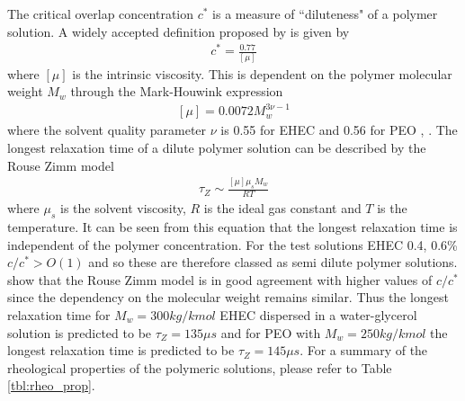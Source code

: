 \documentclass[11pt]{article}
\begin{document}
The critical overlap concentration $c^*$ is a measure of ``diluteness" of a polymer solution. A widely accepted definition proposed by \cite{graessley1980polymer} is given by 
\begin{align}
c^* = \frac{0.77}{\left[ \mu \right]}
\end{align}
where $\left[ \mu \right]$ is the intrinsic viscosity. This is dependent on the polymer molecular weight $M_w$ through the Mark-Houwink expression
\begin{align}
\left[\mu \right] = 0.0072 M_w^{3 \nu - 1}
\end{align}
where the solvent quality parameter $\nu$ is 0.55 for EHEC and 0.56 for PEO \citep{keshavarz2015studying}, \citep{sharma2015rheology}. The longest relaxation time of a dilute polymer solution can be described by the Rouse Zimm model
\begin{align}
\tau_{Z} \sim \frac{\left[\mu \right] \mu_s M_w}{RT}
\end{align}
where $\mu_s$ is the solvent viscosity, $R$ is the ideal gas constant and $T$ is the temperature. It can be seen from this equation that the longest relaxation time is independent of the polymer concentration. For the test solutions EHEC 0.4, 0.6\% $c/c^* > O(1)$ and so these are therefore classed as semi dilute polymer solutions. \cite{tirtaatmadja2006drop} show that the Rouse Zimm model is in good agreement with higher values of $c/c^*$ since the dependency on the molecular weight remains similar. Thus the longest relaxation time for $M_w = 300 kg/kmol$ EHEC dispersed in a water-glycerol solution is predicted to be $\tau_{Z} = 135 \mu s$ and for PEO with $M_w = 250 kg/kmol$ the longest relaxation time is predicted to be $\tau_Z = 145 \mu s$. For a summary of the rheological properties of the polymeric solutions, please refer to Table \ref{tbl:rheo_prop}. 
\end{document}
